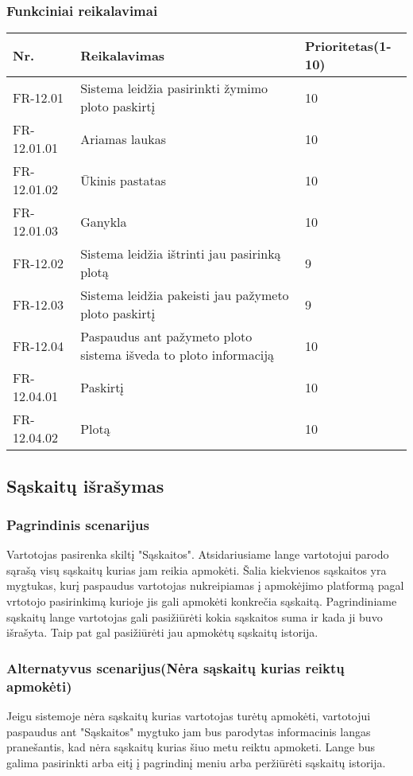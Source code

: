\documentclass[oneside]{VUMIFPSkursinis}
\begin{document}
	\subsubsection{Funkciniai reikalavimai}
	\begin{table}[htbp]
		\begin{tabularx}{1\textwidth}{ |P{2.5cm}|X|P{3cm }| }  \hline
			Nr. & Reikalavimas & Prioritetas(1-10) \\ \hline
			FR-12.01 & Sistema leidžia pasirinkti žymimo ploto paskirtį & 10 \\ \hline
			FR-12.01.01 & Ariamas laukas & 10 \\ \hline
			FR-12.01.02 & Ūkinis pastatas & 10 \\ \hline
			FR-12.01.03 & Ganykla & 10 \\ \hline
			FR-12.02 & Sistema leidžia ištrinti jau pasirinką plotą & 9 \\ \hline
			FR-12.03 & Sistema leidžia pakeisti jau pažymeto ploto paskirtį & 9 \\ \hline
			FR-12.04 & Paspaudus ant pažymeto ploto sistema išveda to ploto informaciją & 10 \\ \hline
			FR-12.04.01 & Paskirtį & 10 \\ \hline
			FR-12.04.02 & Plotą & 10 \\ \hline			
		\end{tabularx}
	\end{table}
\subsection{Sąskaitų išrašymas}
	\subsubsection{Pagrindinis scenarijus}
	Vartotojas pasirenka skiltį "Sąskaitos". Atsidariusiame lange vartotojui parodo sąrašą visų sąskaitų kurias jam reikia apmokėti. Šalia kiekvienos sąskaitos yra mygtukas, kurį paspaudus vartotojas nukreipiamas į apmokėjimo platformą pagal vrtotojo pasirinkimą kurioje jis gali apmokėti konkrečia sąskaitą. Pagrindiniame sąskaitų lange vartotojas gali pasižiūrėti kokia sąskaitos suma ir kada ji buvo išrašyta. Taip pat gal pasižiūrėti jau apmokėtų sąskaitų istorija.
	\subsubsection{Alternatyvus scenarijus(Nėra sąskaitų kurias reiktų apmokėti)}
	Jeigu sistemoje nėra sąskaitų kurias vartotojas turėtų apmokėti, vartotojui paspaudus ant "Sąskaitos" mygtuko jam bus parodytas informacinis langas pranešantis, kad nėra sąskaitų kurias šiuo metu reiktu apmoketi. Lange bus galima pasirinkti arba eitį į pagrindinį meniu arba peržiūrėti sąskaitų istorija.
\end{document}
